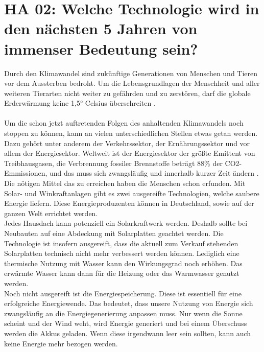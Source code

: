 \section{HA 02: Welche Technologie wird in den nächsten 5 Jahren von immenser Bedeutung sein?}
  Durch den Klimawandel sind zukünftige Generationen von Menschen und Tieren vor dem Aussterben bedroht. Um die Lebensgrundlagen der Menschheit und aller weiteren Tierarten nicht weiter zu gefährden und zu zerstören, darf die globale Erderwärmung keine 1,5° Celsius überschreiten \cite{masson-delmotte_ipcc_2019}.\\\\
  Um die schon jetzt auftretenden Folgen des anhaltenden Klimawandels noch stoppen zu können, kann an vielen unterschiedlichen Stellen etwas getan werden. Dazu gehört unter anderem der Verkehrssektor, der Ernährungssektor und vor allem der Energiesektor. Weltweit ist der Energiesektor der größte Emittent von Treibhausgasen, die Verbrennung fossiler Brennstoffe beträgt 88\% der CO2-Emmissionen, und das muss sich zwangsläufig und innerhalb kurzer Zeit ändern \cite{quaschning_regenerative_2019}.\\
  Die nötigen Mittel das zu erreichen haben die Menschen schon erfunden. Mit Solar- und Winkraftanlagen gibt es zwei ausgereifte Technologien, welche saubere Energie liefern. Diese Energieproduzenten können in Deutschland, sowie auf der ganzen Welt errichtet werden. \\
  Jedes Hausdach kann potenziell ein Solarkraftwerk werden. Deshalb sollte bei Neubauten auf eine Abdeckung mit Solarplatten geachtet werden. Die Technologie ist insofern ausgereift, dass die aktuell zum Verkauf stehenden Solarplatten technisch nicht mehr verbessert werden können. Lediglich eine thermische Nutzung mit Wasser kann den Wirkungsgrad noch erhöhen. Das erwärmte Wasser kann dann für die Heizung oder das Warmwasser genutzt werden.\\
  Noch nicht ausgereift ist die Energiespeicherung. Diese ist essentiell für eine erfolgreiche Energiewende. Das bedeutet, dass unsere Nutzung von Energie sich zwangsläufig an die Energiegenerierung anpassen muss. Nur wenn die Sonne scheint und der Wind weht, wird Energie generiert und bei einem Überschuss werden die Akkus geladen. Wenn diese irgendwann leer sein sollten, kann auch keine Energie mehr bezogen werden.\\
